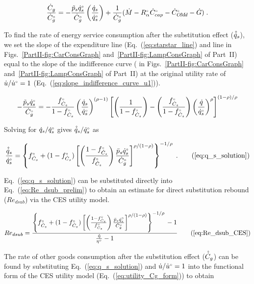\begin{equation} \label{eq:starstar_line}
  \frac{\dot{C}_g}{{}{\dot{C}}^{\scriptscriptstyle \circ}_g} =
      -\frac{\tilde{p}_s {}{\dot{q}}^{\scriptscriptstyle \circ}_s}
            {{}{\dot{C}}^{\scriptscriptstyle \circ}_g}
        \left(  \frac{\dot{q}_s}{{}{\dot{q}}^{\scriptscriptstyle \circ}_s} \right)
      + \frac{1}{{}{\dot{C}}^{\scriptscriptstyle \circ}_g}
        (\dot{M} - {}{R}^{\scriptscriptstyle \circ}_\alpha {}{\dot{C}}^{\scriptscriptstyle \circ}_{cap} - {}{\dot{C}}^{\scriptscriptstyle \circ}_{O\!M\!d} - \dot{G}) \; .
\end{equation}

To find the rate of energy service consumption after the substitution effect
($\hat{\dot{q}}_s$), we set the slope of the
expenditure line (Eq.~(\ref{eq:starstar_line})
and line \starstar{} in
Figs.~\ref{PartII-fig:CarConsGraph}
and~\ref{PartII-fig:LampConsGraph} of Part~II)
equal to the slope of the
indifference curve
(\iicirc{} in
Figs.~\ref{PartII-fig:CarConsGraph}
and~\ref{PartII-fig:LampConsGraph} of Part~II)
at the original utility rate of $\dot{u}/{}{\dot{u}}^{\scriptscriptstyle \circ} = 1$ (Eq.~(\ref{eq:slope_indifference_curve_u1})).

\begin{equation}
  -\frac{\amacro{p}_s \rbempl{q}_s}
        {\rbempl{C}_g} =
    -\frac{\fCs}{1 - \fCs} \left( \frac{\rate{q}_s}{\rbempl{q}_s} \right)^{(\rho -1)} %
        \left[ \left( \frac{1}{1 - \fCs} \right)
                - \left( \frac{\fCs}{1 - \fCs} \right)
                          \left( \frac{\rate{q}}{\rbempl{q}_s} \right)^\rho \right]^{(1 - \rho)/\rho}
\end{equation}

Solving for $\dot{q}_s/{}{\dot{q}}^{\scriptscriptstyle \circ}_s$ gives $\hat{\dot{q}}_s/{}{\dot{q}}^{\scriptscriptstyle \circ}_s$ as

\begin{equation}
  \frac{\rasub{q}_s}{\rbempl{q}_s} = \qssolution{} \; . \tag{\ref{eq:q_s_solution}}
\end{equation}

Eq.~(\ref{eq:q_s_solution}) can be substituted directly
into Eq.~(\ref{eq:Re_dsub_prelim})
to obtain an estimate for direct substitution rebound ($Re_{dsub}$)
via the CES utility model.

\begin{equation}
  Re_{dsub} = \RedsubCES{} \tag{\ref{eq:Re_dsub_CES}}
\end{equation}

The rate of other goods consumption after the substitution effect ($\hat{\dot{C}}_g$)
can be found by substituting Eq.~(\ref{eq:q_s_solution}) and
$\dot{u}/{}{\dot{u}}^{\scriptscriptstyle \circ} = 1$
into the functional form of the CES utility model (Eq.~(\ref{eq:utility_Cg_form}))
to obtain

